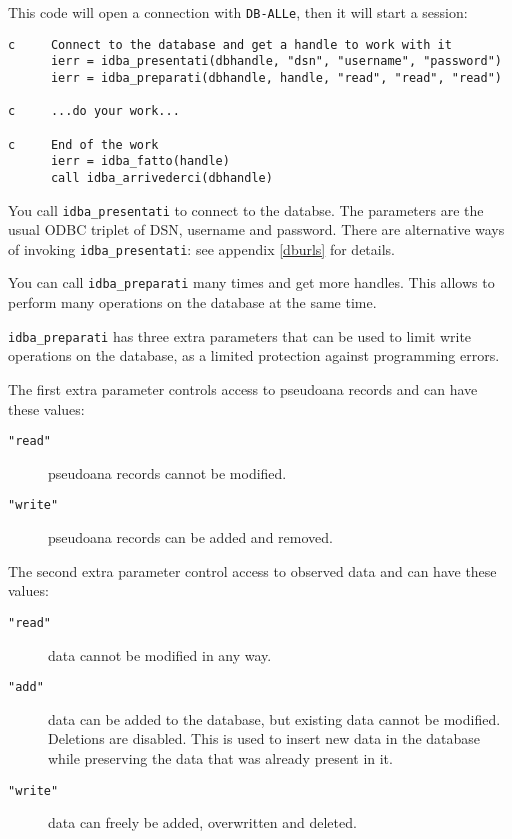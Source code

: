 \documentclass[final,12pt,a4paper,twoside]{book}
\newcommand{\dballe}{{\tt DB-ALLe}}
\begin{document}
This code will open a connection with \dballe{}, then it will start a session:

\label{fun-idba_presentati}
\label{fun-idba_preparati}

\begin{verbatim}
c     Connect to the database and get a handle to work with it
      ierr = idba_presentati(dbhandle, "dsn", "username", "password")
      ierr = idba_preparati(dbhandle, handle, "read", "read", "read")

c     ...do your work...

c     End of the work
      ierr = idba_fatto(handle)
      call idba_arrivederci(dbhandle)
\end{verbatim}

You call {\tt idba\_presentati} to connect to the databse. The parameters are
the usual ODBC triplet of DSN, username and password. 
There are alternative ways of invoking {\tt idba\_presentati}: see appendix
\ref{dburls} for details.

You can call {\tt idba\_preparati} many times and get more handles.  This allows
to perform many operations on the database at the same time.

{\tt idba\_preparati} has three extra parameters that can be used to limit
write operations on the database, as a limited protection against programming
errors.

The first extra parameter controls access to pseudoana records and can have
these values:

\begin{description}
\item[{\tt "read"}] pseudoana records cannot be modified.
\item[{\tt "write"}] pseudoana records can be added and removed.
\end{description}

The second extra parameter control access to observed data and can have
these values:

\begin{description}
\item[{\tt "read"}] data cannot be modified in any way.
\item[{\tt "add"}] data can be added to the database, but existing data cannot
		   be modified.  Deletions are disabled.  This is used to
		   insert new data in the database while preserving the data
		   that was already present in it.
\item[{\tt "write"}] data can freely be added, overwritten and deleted.
\end{description}
\end{document}
